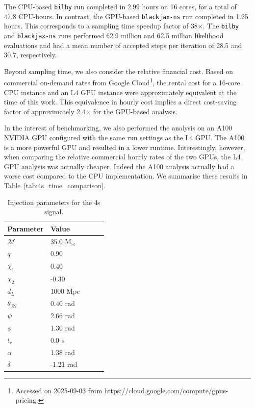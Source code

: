 \documentclass[fleqn,usenatbib]{mnras}
\begin{document}
The CPU-based \texttt{bilby} run completed in 2.99 hours on 16 cores, for a total of
47.8 CPU-hours. In contrast, the GPU-based \texttt{blackjax-ns} run
completed in 1.25 hours. This corresponds to a sampling time speedup factor
of 38$\times$. The \texttt{bilby} and \texttt{blackjax-ns} runs performed
62.9 million and 62.5 million likelihood evaluations and had a
mean number of accepted steps per iteration of 28.5 and 30.7, respectively.

Beyond sampling time, we also consider the relative financial cost. Based
on commercial on-demand rates from Google Cloud\footnote{Accessed on 2025-09-03 from https://cloud.google.com/compute/gpus-pricing.}, 
the rental cost for a 16-core
CPU instance and an L4 GPU instance were approximately equivalent at
the time of this work. This equivalence in hourly cost implies a direct
cost-saving factor of approximately 2.4$\times$ for the GPU-based analysis.

In the interest of benchmarking, we also performed the analysis on 
an A100 NVIDIA GPU configured with the same run settings as the L4 GPU.
The A100 is a more powerful GPU and resulted in a lower runtime. Interestingly,
however, when comparing the relative commercial hourly rates of the two GPUs,
the L4 GPU analysis was actually cheaper. Indeed the A100 analysis actually had a 
worse cost compared to the CPU implementation. We summarise these results in 
Table~\ref{tab:4s_time_comparison}.

\begin{table}
    \centering
    \caption{Injection parameters for the 4s signal.}
    \label{tab:injection_params}
    \begin{tabular}{l l l c c}
    \hline
    \hline
    \textbf{Parameter} & \textbf{Value} \\
    \hline
    $\mathcal{M}$ & 35.0 M$_{\odot}$ \\
    $q$ & 0.90 \\
    $\chi_1$ & 0.40 \\
    $\chi_2$ & -0.30 \\
    $d_L$ & 1000 Mpc \\
    $\theta_{\textrm{JN}}$ & 0.40 rad \\
    $\psi$ & 2.66 rad \\
    $\phi$ & 1.30 rad \\
    $t_c$ & 0.0 s\\
    $\alpha$ & 1.38 rad \\
    $\delta$ & -1.21 rad \\
    \hline
    \hline
    \end{tabular}
    \end{table}
\end{document}
